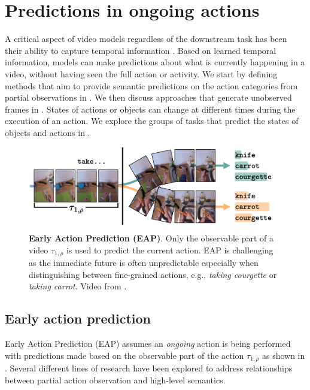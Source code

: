 \section{Predictions in ongoing actions}
\label{sec:prediction}

A critical aspect of video models regardless of the downstream task has been their ability to capture temporal information \citep{huang2018makes}. Based on learned temporal information, models can make predictions about what is currently happening in a video, without having seen the full action or activity. We start by defining methods that aim to provide semantic predictions on the action categories from partial observations in . We then discuss approaches that generate unobserved frames in . States of actions or objects can change at different times during the execution of an action. We explore the groups of tasks that predict the states of objects and actions in . 

\begin{figure}[t]
    \centering
    \includegraphics[width=\linewidth]{figs/EAP.pdf}
    \caption{\textbf{Early Action Prediction (EAP)}. Only the observable part of a video $\tau_{1,\rho}$ is used to predict the current action. EAP is challenging as the immediate future is often unpredictable especially when distinguishing between fine-grained actions, e.g., \textit{taking courgette} or \textit{taking carrot}. Video from \citet{damen2022rescaling}.}
    \label{fig:EAP_overview}
\end{figure}


\subsection{Early action prediction}
\label{sec:prediction::EAP}

Early Action Prediction (EAP) assumes an \emph{ongoing} action is being performed with predictions made based on the observable part of the action $\tau_{1,\rho}$ as shown in . %
Several different lines of research have been explored to address relationships between partial action observation and high-level semantics.

